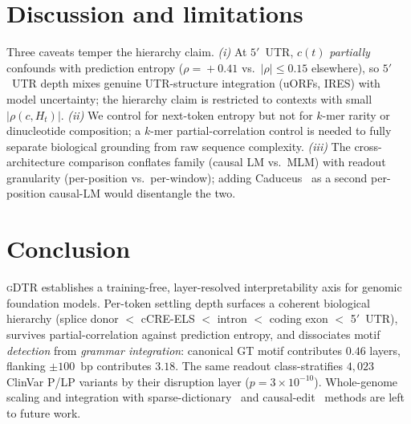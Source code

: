 \documentclass{article}
\theoremstyle{plain}
\theoremstyle{definition}
\theoremstyle{remark}
\newcommand{\gDTR}{\textsc{gDTR}}
\begin{document}
\section{Discussion and limitations}
\label{sec:discussion}

Three caveats temper the hierarchy claim. \emph{(i)} At $5'$~UTR, $c(t)$ \emph{partially} confounds with prediction entropy ($\rho\!=\!+0.41$ vs.\ $|\rho|\!\le\!0.15$ elsewhere), so $5'$~UTR depth mixes genuine UTR-structure integration (uORFs, IRES) with model uncertainty; the hierarchy claim is restricted to contexts with small $|\rho(c, H_t)|$. \emph{(ii)} We control for next-token entropy but not for $k$-mer rarity or dinucleotide composition; a $k$-mer partial-correlation control is needed to fully separate biological grounding from raw sequence complexity. \emph{(iii)} The cross-architecture comparison conflates family (causal LM vs.\ MLM) with readout granularity (per-position vs.\ per-window); adding Caduceus~\cite{schiff2024caduceus} as a second per-position causal-LM would disentangle the two.


\section{Conclusion}
\label{sec:conclusion}

\gDTR{} establishes a training-free, layer-resolved interpretability axis for genomic foundation models. Per-token settling depth surfaces a coherent biological hierarchy (splice donor $<$ cCRE-ELS $<$ intron $<$ coding exon $<$ 5$'$~UTR), survives partial-correlation against prediction entropy, and dissociates motif \emph{detection} from \emph{grammar integration}: canonical GT motif contributes $0.46$ layers, flanking $\pm 100$~bp contributes $3.18$. The same readout class-stratifies $4{,}023$ ClinVar P/LP variants by their disruption layer ($p\!=\!3\!\times\!10^{-10}$). Whole-genome scaling and integration with sparse-dictionary~\cite{cunningham2023sparse} and causal-edit~\cite{meng2022rome} methods are left to future work.





\newpage
\appendix
\onecolumn

\end{document}
